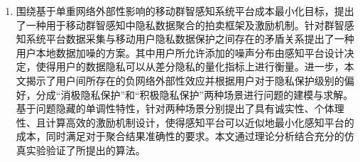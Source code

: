 \begin{enumerate}
     \item 围绕基于单重网络外部性影响的移动群智感知系统平台成本最小化目标，提出了一种用于移动群智感知中隐私数据聚合的拍卖框架及激励机制。针对群智感知系统平台数据采集与移动用户隐私数据保护之间存在的矛盾关系提出了一种用户本地数据加噪的方案。其中用户所允许添加的噪声分布由感知平台设计决定，使得用户的数据隐私可以从差分隐私的量化指标上进行衡量。进一步，本文揭示了用户间所存在的负网络外部性效应并根据用户对于隐私保护级别的偏好，分成“消极隐私保护”和“积极隐私保护”两种场景进行问题的建模与求解。基于问题隐藏的单调性特性，针对两种场景分别提出了具有诚实性、个体理性、且计算高效的激励机制设计，使得感知平台可以近似地最小化感知平台的成本，同时满足对于聚合结果准确性的要求。本文通过理论分析结合充分的仿真实验验证了所提出的算法。


\end{enumerate}
